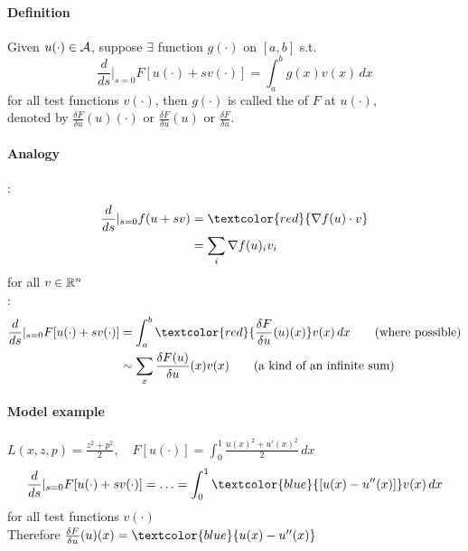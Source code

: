 \documentclass[11pt]{article}
\begin{document}
\paragraph{Definition}
Given $u(\cdot) \in \mathcal{A}$, suppose $\exists$ function $g(\cdot)$ on $[a,b]$ s.t.
$$\frac{d}{ds}|_{s=0} F[u(\cdot) + sv(\cdot)] = \int_a^b g(x) v(x) \, dx$$ for all test functions $v(\cdot)$, then $g(\cdot)$ is called the  of $F$ at $u(\cdot)$, \\denoted by $\frac{\delta F}{\delta u}(u)(\cdot)$ or $\frac{\delta F}{\delta u}(u)$ or $\frac{\delta F}{\delta u}$.

\paragraph{Analogy}
:
\begin{align}
\frac{d}{ds}|_{s=0}f(u+sv) &= \textcolor{red}{\nabla f(u)\cdot v} \\
&= \sum_i \nabla f(u)_i v_i	
\end{align}
for all $v \in \mathbb{R}^n$ \\
:
\begin{align}
	\frac{d}{ds}|_{s=0} F[u(\cdot) + sv(\cdot)] &= \int_a^b \textcolor{red}{\frac{\delta F}{\delta u}(u)(x)} v(x) \, dx \tag{where possible} \\
	&\sim \sum_x \frac{\delta F(u)}{\delta u} (x) v(x) \tag{a kind of an infinite sum}
\end{align}

\paragraph{Model example}
$L(x, z, p) = \frac{z^2 + p^2}{2}, \quad F[u(\cdot)] = \int_0^1 \frac{u(x)^2 + u'(x)^2}{2} \, dx$\\
$$\frac{d}{ds}|_{s=0} F[u(\cdot) + sv(\cdot)] = \hdots = \int_0^1 \textcolor{blue}{[u(x) - u''(x)]}v(x) \, dx$$ for all test functions $v(\cdot)$\\
Therefore 
$\frac{\delta F}{\delta u}(u)(x) = \textcolor{blue}{u(x) - u''(x)}$
\end{document}
